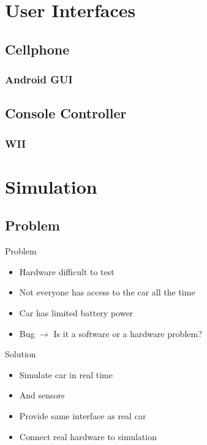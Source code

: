 \documentclass[pdf]{beamer}
\begin{document}
\section{User Interfaces}
\subsection{Cellphone}
\begin{frame}
\frametitle{Android GUI}
  \begin{center}
  \end{center}
\end{frame}
\subsection{Console Controller}
\begin{frame}
\frametitle{WII}
  \begin{center}
  \end{center}
\end{frame}


\section{Simulation}
\subsection{Problem}
\begin{frame}
\begin{alertblock}{Problem}
\begin{itemize}
  \item Hardware difficult to test
  \item Not everyone has access to the car all the time
  \item Car has limited battery power
  \item Bug $\rightarrow$ Is it a software or a hardware problem?
\end{itemize}
\end{alertblock}
\begin{exampleblock}{Solution}
\begin{itemize}
  \item Simulate car in real time
  \item And sensors
  \item Provide same interface as real car
  \item Connect real hardware to simulation
\end{itemize}
\end{exampleblock}
\end{frame}
\end{document}
